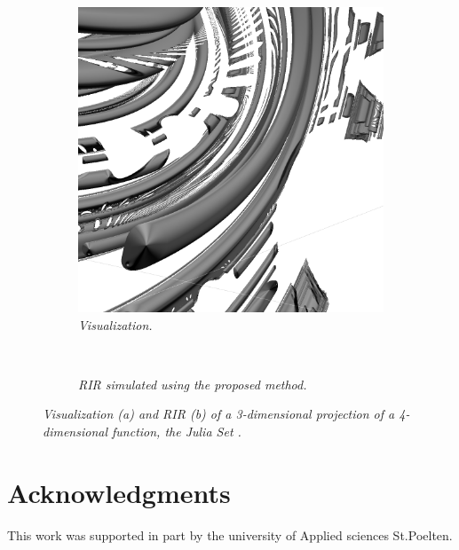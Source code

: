 \documentclass[twoside,a4paper]{article}
\begin{document}
\begin{figure}[ht]
    \center
    \begin{subfigure}[t]{0.4\linewidth}
      \centering
      \includegraphics[width=1\linewidth]{img/julia.png}
    \caption{\label{fig:juliaRend} \it Visualization. }
    \end{subfigure} \

    \begin{subfigure}[t]{0.4\linewidth}
      \centering
      
      \caption{\label{fig:juliaRIR} \it RIR simulated using the proposed method. }
    \end{subfigure}
    \caption{\it Visualization (a) and RIR (b) of a 3-dimensional projection of a 4-dimensional function, the Julia Set \cite{quilez_inigo_nodate-1} .}
    \label{fig:julia}
\end{figure}




\section{Acknowledgments}
This work was supported in part by the university of Applied sciences St.Poelten.

\nocite{*}


\end{document}
